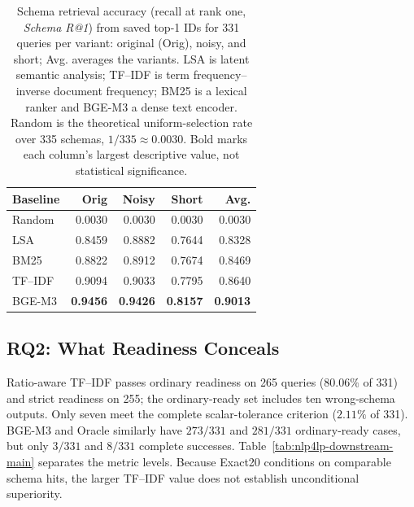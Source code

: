 \documentclass[pdflatex,iicol,sn-basic,Numbered]{sn-jnl}
\begin{document}
\begin{table}[t]
  \centering
  \renewcommand{\arraystretch}{1.18}
  \caption{Schema retrieval accuracy (recall at rank one, \textit{Schema R@1}) from saved top-1 IDs for 331 queries per variant: original (Orig), noisy, and short; Avg. averages the variants. LSA is latent semantic analysis; TF--IDF is term frequency--inverse document frequency; BM25 is a lexical ranker and BGE-M3 a dense text encoder. Random is the theoretical uniform-selection rate over 335 schemas, $1/335 \approx 0.0030$. Bold marks each column's largest descriptive value, not statistical significance.}
  \label{tab:nlp4lp-retrieval-main}
  \small
  \setlength{\tabcolsep}{3pt}
  \begin{tabular}{@{}lrrrr@{}}
    \toprule
    Baseline & Orig & Noisy & Short & Avg. \\
    \midrule
    Random  & 0.0030 & 0.0030 & 0.0030 & 0.0030 \\
    LSA     & 0.8459 & 0.8882 & 0.7644 & 0.8328 \\
    BM25    & 0.8822 & 0.8912 & 0.7674 & 0.8469 \\
    TF--IDF & 0.9094 & 0.9033 & 0.7795 & 0.8640 \\
    BGE-M3 & \textbf{0.9456} & \textbf{0.9426} & \textbf{0.8157} & \textbf{0.9013} \\
    \bottomrule
  \end{tabular}
\end{table}

\subsection{RQ2: What Readiness Conceals}
\label{subsec:exp_downstream}
Ratio-aware TF--IDF passes ordinary readiness on 265 queries ($80.06\%$ of 331) and strict readiness on 255; the ordinary-ready set includes ten wrong-schema outputs. Only seven meet the complete scalar-tolerance criterion ($2.11\%$ of 331). BGE-M3 and Oracle similarly have $273/331$ and $281/331$ ordinary-ready cases, but only $3/331$ and $8/331$ complete successes. Table~\ref{tab:nlp4lp-downstream-main} separates the metric levels. Because Exact20 conditions on comparable schema hits, the larger TF--IDF value does not establish unconditional superiority.
\end{document}

